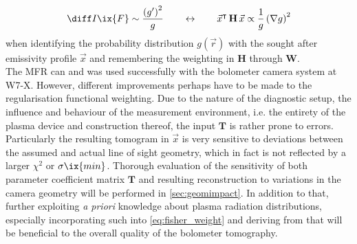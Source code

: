 %
        \begin{align}%
            \diff I\ix{F}\sim\frac{\left(g^{\prime}\right)^{2}}{g}\qquad\leftrightarrow\qquad\vec{x}^{\intercal}\,\mathbf{H}\,\vec{x}\propto\frac{1}{g}\left(\nabla g\right)^{2}\nonumber%
        \end{align}%
%
        when identifying the probability distribution $g\left(\vec{r}\right)$ with the sought after emissivity profile $\vec{x}$ and remembering the weighting in $\mathbf{H}$ through $\mathbf{W}$.\\%
        The MFR can and was used successfully with the bolometer camera system at W7-X. However, different improvements perhaps have to be made to the regularisation functional weighting. Due to the nature of the diagnostic setup, the influence and behaviour of the measurement environment, i.e. the entirety of the plasma device and construction thereof, the input $\mathbf{T}$ is rather prone to errors. Particularly the resulting tomogram in $\vec{x}$ is very sensitive to deviations between the assumed and actual line of sight geometry, which in fact is not reflected by a larger $\chi^{2}$ or $\sigma\ix{min}$. Thorough evaluation of the sensitivity of both parameter coefficient matrix $\mathbf{T}$ and resulting reconstruction to variations in the camera geometry will be performed in \cref{sec:geomimpact}. In addition to that, further exploiting \textit{a priori} knowledge about plasma radiation distributions, especially incorporating such into \cref{eq:fisher_weight} and deriving from that will be beneficial to the overall quality of the bolometer tomography.%
%
